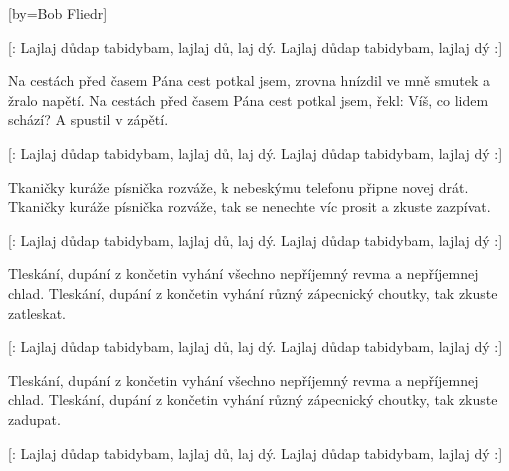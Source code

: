 [by={Bob Fliedr}]

\beginchorus{}
[: Lajlaj důdap tabidybam, lajlaj dů, laj dý.
Lajlaj důdap tabidybam, lajlaj dý :]
\endchorus{}

\beginverse{}
Na cestách před časem Pána cest potkal jsem,
zrovna hnízdil ve mně smutek a žralo napětí.
Na cestách před časem Pána cest potkal jsem,
řekl: Víš, co lidem schází? A spustil v zápětí.
\endverse{}

\beginchorus{}
[: Lajlaj důdap tabidybam, lajlaj dů, laj dý.
Lajlaj důdap tabidybam, lajlaj dý :]
\endchorus{}

\beginverse{}
Tkaničky kuráže písnička rozváže,
k nebeskýmu telefonu připne novej drát.
Tkaničky kuráže písnička rozváže,
tak se nenechte víc prosit a zkuste zazpívat.
\endverse{}

\beginchorus{}
[: Lajlaj důdap tabidybam, lajlaj dů, laj dý.
Lajlaj důdap tabidybam, lajlaj dý :]
\endchorus{}

\beginverse{}
Tleskání, dupání z končetin vyhání
všechno nepříjemný revma a nepříjemnej chlad.
Tleskání, dupání z končetin vyhání
různý zápecnický choutky, tak zkuste zatleskat.
\endverse{}

\beginchorus{}
[: Lajlaj důdap tabidybam, lajlaj dů, laj dý.
Lajlaj důdap tabidybam, lajlaj dý :]
\endchorus{}

\beginverse{}
Tleskání, dupání z končetin vyhání
všechno nepříjemný revma a nepříjemnej chlad.
Tleskání, dupání z končetin vyhání
různý zápecnický choutky, tak zkuste zadupat.
\endverse{}

\beginchorus{}
[: Lajlaj důdap tabidybam, lajlaj dů, laj dý.
Lajlaj důdap tabidybam, lajlaj dý :]
\endchorus{}

\endsong{}
